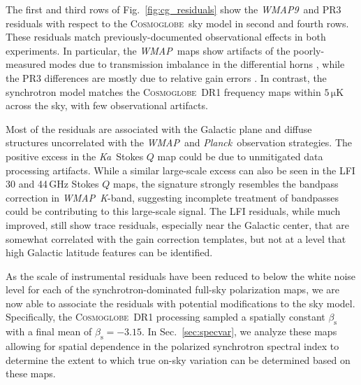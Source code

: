 \documentclass[twocolumn]{../../common/aa}
\def\WMAP{\emph{WMAP}}
\def\WMAPnine{\emph{WMAP9}}
\def\Planck{\emph{Planck}}
\newcommand{\cosmoglobe}{\textsc{Cosmoglobe}}
\newcommand{\K}[0]{\textit K}
\newcommand{\Ka}[0]{\textit{Ka}}
\begin{document}

The first and third rows of Fig.~\ref{fig:cg_residuals} show the \WMAPnine\ and PR3 residuals with respect to the \cosmoglobe\ sky model in second and fourth rows. These residuals match previously-documented observational effects in both experiments. In particular, the \WMAP\ maps show artifacts of the poorly-measured modes due to transmission imbalance in the differential horns \citep{jarosik2007,bennett2012}, while the PR3  differences are mostly  due to relative gain errors \citep{planck2016-l02,planck2020-LVII}.
In contrast, the synchrotron model matches the \cosmoglobe\ DR1 frequency maps within $5\,\mathrm{\mu K}$ across the sky, with few observational artifacts.

Most of the residuals are associated with the Galactic plane and diffuse structures uncorrelated with the \WMAP\ and \Planck\ observation strategies. The positive excess in the \Ka\ Stokes $Q$ map could be due to unmitigated data processing artifacts. While a similar large-scale excess can also be seen in the LFI 30 and 44\,GHz Stokes $Q$ maps, the signature strongly resembles the bandpass correction in \WMAP\ \K-band, suggesting incomplete treatment of bandpasses could be contributing to this large-scale signal.
The LFI residuals, while much improved, still show trace residuals, especially near the Galactic center, that are somewhat correlated with the gain correction templates, but not at a level that high Galactic latitude features can be identified. 

As the scale of instrumental residuals have been reduced to below the white noise level for each of the synchrotron-dominated full-sky polarization maps, we are now able to associate the residuals with potential modifications to the sky model. Specifically, the \cosmoglobe\ DR1 processing sampled a spatially constant $\beta_\mathrm s$ with a final mean of $\beta_\mathrm s=-3.15$. In Sec.~\ref{sec:specvar}, we analyze these maps allowing for spatial dependence in the polarized synchrotron spectral index to determine the extent to which true on-sky variation can be determined based on these maps.
\end{document}
